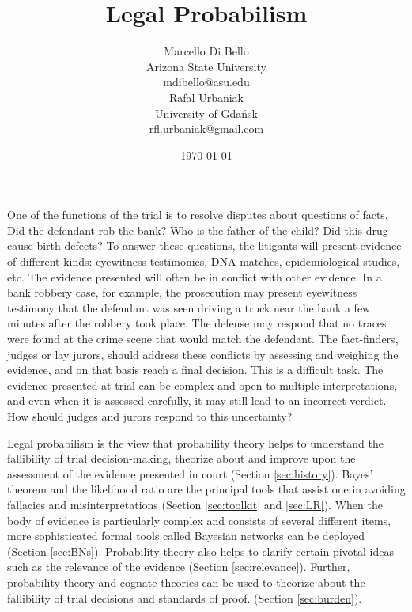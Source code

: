 \documentclass{article}
\title{Legal Probabilism}
\author{Marcello Di Bello\\Arizona State University\\  mdibello@asu.edu 
   \vspace{4mm} \\   
  Rafal Urbaniak\\ 
  University of Gda\' nsk \\
  rfl.urbaniak@gmail.com
  }
\date{\today}
\begin{document}
\maketitle



\thispagestyle{empty}


One of the functions of the trial is to  resolve disputes about  questions of facts. Did the defendant rob the bank? Who is the father of the child? Did this drug cause birth defects? 
To answer these questions, the litigants will present evidence of different kinds: eyewitness testimonies, DNA matches, epidemiological studies, etc. The evidence presented will often be in conflict with other evidence.
In a bank robbery case, for example, the prosecution may present eyewitness testimony that the defendant was seen driving a truck  near the bank a few minutes after the robbery took place. 
The defense may respond that no traces were found at the crime scene that would match the defendant. 
The fact-finders, judges or lay jurors, should address these conflicts by assessing and weighing the evidence, 
and on that basis reach a final decision. This is a difficult task. The evidence presented at trial can be complex and open to multiple interpretations, and even when it is assessed carefully, it may still lead to an incorrect verdict. 
How should judges and jurors respond to this uncertainty?


Legal probabilism is the view that probability theory helps to understand  the fallibility of trial decision-making, theorize about and improve upon the assessment of the evidence presented in court  (Section \ref{sec:history}). 
Bayes' theorem and the likelihood ratio are the principal tools that assist one in  avoiding fallacies and misinterpretations (Section \ref{sec:toolkit} and \ref{sec:LR}).
When the body of evidence is particularly complex and consists of several different items, more sophisticated formal tools called Bayesian networks can be deployed (Section \ref{sec:BNs}). 
Probability theory also helps to clarify certain pivotal ideas such as the relevance of the evidence (Section \ref{sec:relevance}). Further, probability theory and cognate theories %
can be used to theorize about the fallibility of trial decisions and standards of proof.
(Section \ref{sec:burden}).
 
\end{document}
